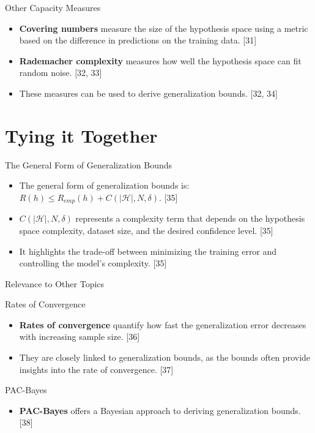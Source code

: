 \documentclass[
  ignorenonframetext,
]{beamer}
\providecommand{\tightlist}{%
  \setlength{\itemsep}{0pt}\setlength{\parskip}{0pt}}\usepackage{longtable,booktabs,array}
\begin{document}
\begin{frame}{Other Capacity Measures}
\label{other-capacity-measures}
\begin{itemize}
\tightlist
\item
  \textbf{Covering numbers} measure the size of the hypothesis space
  using a metric based on the difference in predictions on the training
  data. {[}31{]}
\item
  \textbf{Rademacher complexity} measures how well the hypothesis space
  can fit random noise. {[}32, 33{]}
\item
  These measures can be used to derive generalization bounds. {[}32,
  34{]}
\end{itemize}
\end{frame}

\section{Tying it Together}\label{tying-it-together}

\begin{frame}{The General Form of Generalization Bounds}
\label{the-general-form-of-generalization-bounds}
\begin{itemize}
\tightlist
\item
  The general form of generalization bounds is:
  \(R(h) \leq R_{emp}(h) + C(|\mathcal{H}|, N, \delta)\). {[}35{]}
\item
  \(C(|\mathcal{H}|, N, \delta)\) represents a complexity term that
  depends on the hypothesis space complexity, dataset size, and the
  desired confidence level. {[}35{]}
\item
  It highlights the trade-off between minimizing the training error and
  controlling the model's complexity. {[}35{]}
\end{itemize}
\end{frame}

\begin{frame}{Relevance to Other Topics}
\label{relevance-to-other-topics}
\begin{block}{Rates of Convergence}
\label{rates-of-convergence}
\begin{itemize}
\tightlist
\item
  \textbf{Rates of convergence} quantify how fast the generalization
  error decreases with increasing sample size. {[}36{]}
\item
  They are closely linked to generalization bounds, as the bounds often
  provide insights into the rate of convergence. {[}37{]}
\end{itemize}
\end{block}

\begin{block}{PAC-Bayes}
\label{pac-bayes}
\begin{itemize}
\tightlist
\item
  \textbf{PAC-Bayes} offers a Bayesian approach to deriving
  generalization bounds. {[}38{]}
\end{itemize}
\end{block}
\end{frame}
\end{document}
